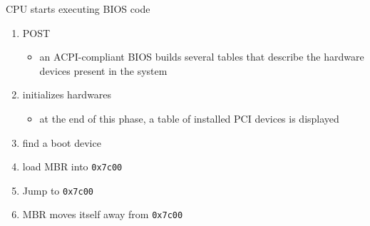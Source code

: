 \begin{frame}{CPU starts executing BIOS code}
  \begin{enumerate}
  \item POST
    \begin{itemize}
    \item an ACPI-compliant BIOS builds several tables that describe the hardware devices
      present in the system
    \end{itemize}
  \item initializes hardwares
    \begin{itemize}
    \item at the end of this phase, a table of installed PCI devices is displayed
    \end{itemize}
  \item find a boot device
  \item load MBR into \texttt{0x7c00}
  \item Jump to \texttt{0x7c00}
  \item MBR moves itself away from \texttt{0x7c00}%
  \end{enumerate}
  \begin{center}
     
  \end{center}
\end{frame}

